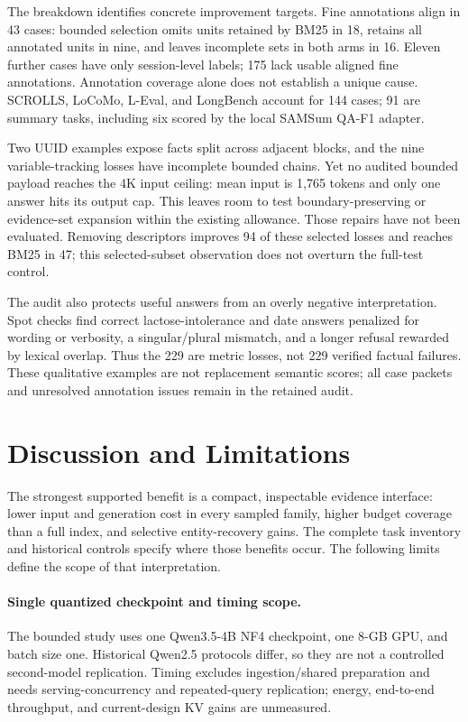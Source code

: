\documentclass[runningheads]{llncs}
\begin{document}


The breakdown identifies concrete improvement targets. Fine annotations align in 43 cases: bounded selection omits units retained by BM25 in 18, retains all annotated units in nine, and leaves incomplete sets in both arms in 16. Eleven further cases have only session-level labels; 175 lack usable aligned fine annotations. Annotation coverage alone does not establish a unique cause. SCROLLS, LoCoMo, L-Eval, and LongBench account for 144 cases; 91 are summary tasks, including six scored by the local SAMSum QA-F1 adapter.

Two UUID examples expose facts split across adjacent blocks, and the nine variable-tracking losses have incomplete bounded chains. Yet no audited bounded payload reaches the 4K input ceiling: mean input is 1,765 tokens and only one answer hits its output cap. This leaves room to test boundary-preserving or evidence-set expansion within the existing allowance. Those repairs have not been evaluated. Removing descriptors improves 94 of these selected losses and reaches BM25 in 47; this selected-subset observation does not overturn the full-test control.

The audit also protects useful answers from an overly negative interpretation. Spot checks find correct lactose-intolerance and date answers penalized for wording or verbosity, a singular/plural mismatch, and a longer refusal rewarded by lexical overlap. Thus the 229 are metric losses, not 229 verified factual failures. These qualitative examples are not replacement semantic scores; all case packets and unresolved annotation issues remain in the retained audit.

\section{Discussion and Limitations}\label{sec:limits}
The strongest supported benefit is a compact, inspectable evidence interface: lower input and generation cost in every sampled family, higher budget coverage than a full index, and selective entity-recovery gains. The complete task inventory and historical controls specify where those benefits occur. The following limits define the scope of that interpretation.

\paragraph{Single quantized checkpoint and timing scope.}
The bounded study uses one Qwen3.5-4B NF4 checkpoint, one 8-GB GPU, and batch size one. Historical Qwen2.5 protocols differ, so they are not a controlled second-model replication. Timing excludes ingestion/shared preparation and needs serving-concurrency and repeated-query replication; energy, end-to-end throughput, and current-design KV gains are unmeasured.
\end{document}
